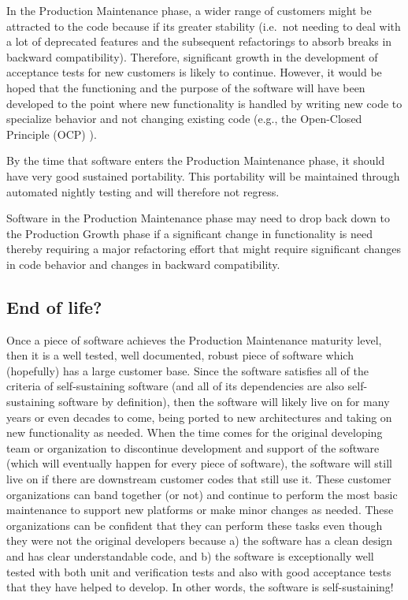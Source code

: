\documentclass[11pt]{SANDreport}
\begin{document}
In the Production Maintenance phase, a wider range of customers might
be attracted to the code because if its greater stability (i.e.\ not
needing to deal with a lot of deprecated features and the subsequent
refactorings to absorb breaks in backward compatibility).  Therefore,
significant growth in the development of acceptance tests for new
customers is likely to continue.  However, it would be hoped that the
functioning and the purpose of the software will have been developed
to the point where new functionality is handled by writing new code to
specialize behavior and not changing existing code (e.g., the
Open-Closed Principle (OCP) {}\cite{AgileSoftwareDevelopment}).

By the time that software enters the Production Maintenance phase, it
should have very good sustained portability.  This portability will be
maintained through automated nightly testing and will therefore not
regress.

Software in the Production Maintenance phase may need to drop back
down to the Production Growth phase if a significant change in
functionality is need thereby requiring a major refactoring effort
that might require significant changes in code behavior and changes in
backward compatibility.


%
\subsection{End of life?}
%

Once a piece of software achieves the Production Maintenance maturity
level, then it is a well tested, well documented, robust piece of
software which (hopefully) has a large customer base.  Since the
software satisfies all of the criteria of self-sustaining software
(and all of its dependencies are also self-sustaining software by
definition), then the software will likely live on for many years or
even decades to come, being ported to new architectures and taking on
new functionality as needed.  When the time comes for the original
developing team or organization to discontinue development and support
of the software (which will eventually happen for every piece of
software), the software will still live on if there are downstream
customer codes that still use it.  These customer organizations can
band together (or not) and continue to perform the most basic
maintenance to support new platforms or make minor changes as needed.
These organizations can be confident that they can perform these tasks
even though they were not the original developers because a) the
software has a clean design and has clear understandable code, and b)
the software is exceptionally well tested with both unit and
verification tests and also with good acceptance tests that they have
helped to develop.  In other words, the software is self-sustaining!
\end{document}
